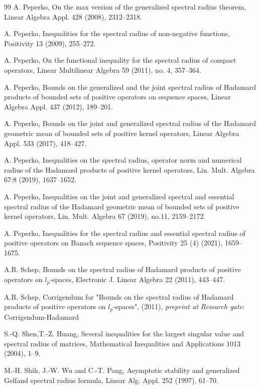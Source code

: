 \documentclass[12pt, reqno]{amsart}
\theoremstyle{definition}
\theoremstyle{remark}
\numberwithin{equation}{section}
\begin{document}
\begin{thebibliography}{99}
 A. Peperko, On the max version of the generalized spectral radius theorem,  Linear Algebra
         Appl. 428 (2008), 2312--2318.

 A. Peperko, Inequalities for the spectral radius of non-negative functions,
 Positivity 13 (2009), 255--272.

 A. Peperko, On the functional inequality for the spectral radius of compact operators, Linear Multilinear Algebra
 59 (2011), no. 4, 357--364.

 A. Peperko, Bounds on the generalized and the joint spectral radius of Hadamard products of bounded sets of positive operators on sequence
spaces, Linear Algebra  Appl. 437 (2012), 189--201.

 A. Peperko,  Bounds on the joint and generalized spectral radius of the Hadamard geometric mean of bounded sets of positive kernel operators,
Linear Algebra  Appl. 533 (2017), 418--427.

 A. Peperko, Inequalities on the spectral radius, operator norm and numerical radius of the Hadamard products of positive kernel operators,  Lin. Mult. Algebra 67:8 (2019), 1637--1652. %

 A. Peperko, Inequalities on the joint and generalized spectral and essential spectral radius of the Hadamard geometric mean of bounded sets of positive kernel operators,  Lin. Mult. Algebra 67 (2019), no.11, 2159--2172.

 A. Peperko, Inequalities for the spectral radius and essential spectral radius of positive operators on Banach sequence spaces, Positivity 25 (4) (2021), 1659--1675.

 A.R. Schep, Bounds on the spectral radius of Hadamard products of positive operators on $l_p$-spaces,  Electronic J. Linear Algebra 22 
(2011), 443--447.

 A.R. Schep, Corrigendum for "Bounds on the spectral radius of Hadamard products of positive operators on $l_p$-spaces", (2011), {\it preprint
at Research gate}: Corrigendum-Hadamard    

 S.-Q. Shen,T.-Z. Huang, Several inequalities for the largest singular value and spectral radius of matrices, Mathematical Inequalities  and Applications 1013 (2004), 1--9.

 M.-H. Shih, J.-W. Wu and C.-T. Pang, Asymptotic stability and generalized Gelfand
spectral radius formula,  Linear Alg. Appl. 252 (1997), 61--70.


\end{thebibliography}
\end{document}
